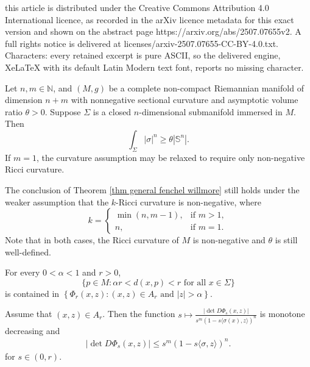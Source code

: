 \documentclass[10pt,a4paper]{amsart}
\begin{document}
this article is distributed under the Creative Commons Attribution 4.0 International licence, as recorded in the arXiv licence metadata for this exact version and shown on the abstract page https://arxiv.org/abs/2507.07655v2. A full rights notice is delivered at licenses/arxiv-2507.07655-CC-BY-4.0.txt. Characters: every retained excerpt is pure ASCII, so the delivered engine, XeLaTeX with its default Latin Modern text font, reports no missing character.
\begin{theorem}\label{thm general fenchel willmore}
Let $n, m \in \mathbb{N}$, and $(M, g)$ be a complete non-compact Riemannian manifold of dimension $n+m$ with nonnegative sectional curvature and asymptotic volume ratio $\theta>0$. Suppose $\Sigma$ is a closed $n$-dimensional submanifold immersed in $M$. Then
\begin{equation}\label{ineq fenchel willmore}
\int_{\Sigma}|\sigma|^n \ge \theta|\mathbb S^n|.
\end{equation}
If $m=1$, the curvature assumption may be relaxed to require only non-negative Ricci curvature.
\end{theorem}

\begin{theorem}\label{thm general fenchel willmore'}
The conclusion of Theorem \ref{thm general fenchel willmore} still holds under the weaker assumption that the $k$-Ricci curvature is non-negative, where
\begin{equation}\label{eq k}
k=
\begin{cases}
\min(n, m-1), & \text{if } m > 1, \\
n, & \text{if } m = 1.
\end{cases}
\end{equation}
Note that in both cases, the Ricci curvature of $M$ is non-negative and $\theta$ is still well-defined.
\end{theorem}

\begin{lemma}\label{lem 2.2''}
For every $0 <\alpha<1$ and $r>0$,
$$
\{p \in M: \alpha r<d(x, p)<r \text { for all } x \in \Sigma\}
$$
is contained in $\left\{\Phi_r(x, z):(x, z) \in A_r \text { and }|z|>\alpha\right\}$.
\end{lemma}

\begin{lemma}\label{lem 2.4''}
Assume that $(x, z) \in A_r$. Then the function
$s \mapsto \frac{|\det D\Phi_s(x, z)|}{s^m(1-s\langle \sigma(x), z\rangle)^n}$
is monotone decreasing and
\begin{align*}
|\det D\Phi_s(x, z)|\le {s^m(1-s\langle \sigma, z\rangle)^n}.
\end{align*}
for $s \in(0, r)$.
\end{lemma}
\end{document}
